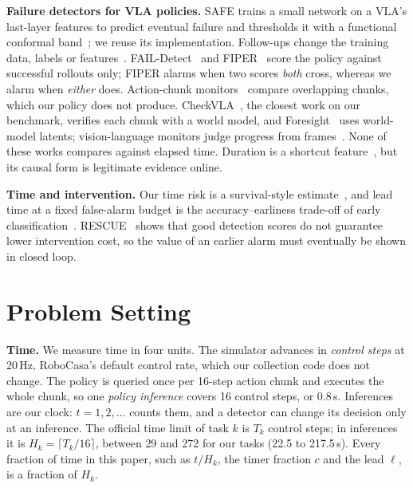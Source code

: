 \documentclass[10pt,a4paper,twocolumn]{article}
\begin{document}
\textbf{Failure detectors for VLA policies.} SAFE trains a small network on a VLA's
last-layer features to predict eventual failure and thresholds it with a functional
conformal band~\cite{gu2025safe}; we reuse its implementation. Follow-ups change the
training data, labels or features~\cite{rajaprakash2026safecast,park2026hideseek,ma2026failurespot,yang2026triinfo,zhu2026vlascope}.
FAIL-Detect~\cite{xu2025faildetect} and FIPER~\cite{romer2025fiper} score the policy
against successful rollouts only; FIPER alarms when two scores \emph{both} cross, whereas we
alarm when \emph{either} does. Action-chunk monitors~\cite{agia2024sentinel,seligmann2026vlafail,huang2026actprobe}
compare overlapping chunks, which our policy does not produce. CheckVLA~\cite{liu2026checkvla},
the closest work on our benchmark, verifies each chunk with a world model, and
Foresight~\cite{wang2026foresight} uses world-model latents; vision-language monitors judge
progress from frames~\cite{liu2023reflect,sinha2024realtime,zhou2025codeasmonitor,duan2025aha}.
None of these works compares against elapsed time. Duration is a shortcut
feature~\cite{geirhos2020shortcut}, but its causal form is legitimate evidence online.

\textbf{Time and intervention.} Our time risk is a survival-style
estimate~\cite{kaplan1958,cox1972}, and lead time at a fixed false-alarm budget is the
accuracy--earliness trade-off of early classification~\cite{xing2012early}.
RESCUE~\cite{ahmedt2026rescue} shows that good detection scores do not guarantee lower
intervention cost, so the value of an earlier alarm must eventually be shown in closed loop.

\section{Problem Setting}

\textbf{Time.} We measure time in four units. The simulator advances
in \emph{control steps} at 20\,Hz, RoboCasa's default control rate, which our collection
code does not change. The policy is queried once per 16-step action chunk and executes the
whole chunk, so one \emph{policy inference} covers 16 control steps, or 0.8\,s. Inferences
are our clock: $t = 1, 2, \dots$ counts them, and a detector can change its decision only
at an inference. The official time limit of task $k$ is $T_k$ control steps; in
inferences it is $H_k = \lceil T_k/16 \rceil$, between 29 and 272 for our tasks (22.5 to
217.5\,s). Every fraction of time in this paper, such as
$t/H_k$, the timer fraction $c$ and the lead $\ell$, is a fraction of $H_k$.
\end{document}
